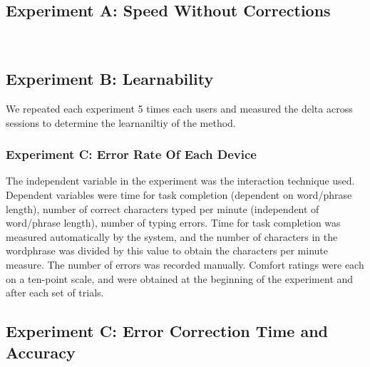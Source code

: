 \subsection{Experiment A: Speed Without Corrections}
~\cite{william1995theoretical}

\subsection{Experiment B: Learnability}
We repeated each experiment 5 times each users and measured the delta across sessions to determine the learnaniltiy of the method.

\subsubsection{Experiment C: Error Rate Of Each Device}
The independent variable in the experiment was the interaction technique used. Dependent variables were time for task completion (dependent on word/phrase length), number of correct characters typed per minute (independent of word/phrase length), number of typing errors. Time for task completion was
measured automatically by the system, and the number of
characters in the wordphrase was divided by this value to
obtain the characters per minute measure. The number of
errors was recorded manually. Comfort ratings were each on a
ten-point scale, and were obtained at the beginning of the
experiment and after each set of trials. 

\subsection{Experiment C: Error Correction Time and Accuracy}






